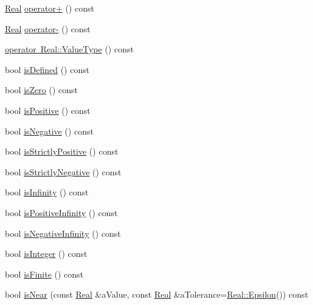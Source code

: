 \begin{DoxyCompactItemize}
\item 
\mbox{\hyperlink{classlibrary_1_1core_1_1types_1_1_real}{Real}} \mbox{\hyperlink{classlibrary_1_1core_1_1types_1_1_real_a7f39b72df1d66f354dce558a99dc2da5}{operator+}} () const
\item 
\mbox{\hyperlink{classlibrary_1_1core_1_1types_1_1_real}{Real}} \mbox{\hyperlink{classlibrary_1_1core_1_1types_1_1_real_a7a018943c5110e4023f5e462eed70a25}{operator-\/}} () const
\item 
\mbox{\hyperlink{classlibrary_1_1core_1_1types_1_1_real_a04a25244977883708efaa427e411703b}{operator Real\+::\+Value\+Type}} () const
\item 
bool \mbox{\hyperlink{classlibrary_1_1core_1_1types_1_1_real_a424f4e213c63db76b879c294b9126e37}{is\+Defined}} () const
\item 
bool \mbox{\hyperlink{classlibrary_1_1core_1_1types_1_1_real_a7f9a08009b4d5033ff8c9eaa4a6b2c7e}{is\+Zero}} () const
\item 
bool \mbox{\hyperlink{classlibrary_1_1core_1_1types_1_1_real_af2ace2b52781a5e537daef7e6cee6df3}{is\+Positive}} () const
\item 
bool \mbox{\hyperlink{classlibrary_1_1core_1_1types_1_1_real_aa12d6c4d50c80dc184e34d6e52c9dd10}{is\+Negative}} () const
\item 
bool \mbox{\hyperlink{classlibrary_1_1core_1_1types_1_1_real_ac96efb831bb08fd5cfe0f8cfc18ee6b1}{is\+Strictly\+Positive}} () const
\item 
bool \mbox{\hyperlink{classlibrary_1_1core_1_1types_1_1_real_a91029945199886cd83279f29cc225b91}{is\+Strictly\+Negative}} () const
\item 
bool \mbox{\hyperlink{classlibrary_1_1core_1_1types_1_1_real_a4603222d9315aa59355778d66c0b214d}{is\+Infinity}} () const
\item 
bool \mbox{\hyperlink{classlibrary_1_1core_1_1types_1_1_real_a432e5a765554e8656e9bcb6d54f1553d}{is\+Positive\+Infinity}} () const
\item 
bool \mbox{\hyperlink{classlibrary_1_1core_1_1types_1_1_real_a5d7286e45a9f05cda79402c9d8efbc13}{is\+Negative\+Infinity}} () const
\item 
bool \mbox{\hyperlink{classlibrary_1_1core_1_1types_1_1_real_ad2709f64d24cb119403a0a6d386f5eda}{is\+Integer}} () const
\item 
bool \mbox{\hyperlink{classlibrary_1_1core_1_1types_1_1_real_a3355dd60d401e1f464d0bc20be9a32d5}{is\+Finite}} () const
\item 
bool \mbox{\hyperlink{classlibrary_1_1core_1_1types_1_1_real_a59cda3a7c738f0d0244e408dadeb079c}{is\+Near}} (const \mbox{\hyperlink{classlibrary_1_1core_1_1types_1_1_real}{Real}} \&a\+Value, const \mbox{\hyperlink{classlibrary_1_1core_1_1types_1_1_real}{Real}} \&a\+Tolerance=\mbox{\hyperlink{classlibrary_1_1core_1_1types_1_1_real_a5f3b76a5055cb042c25448b873e39663}{Real\+::\+Epsilon}}()) const

\end{DoxyCompactItemize}
